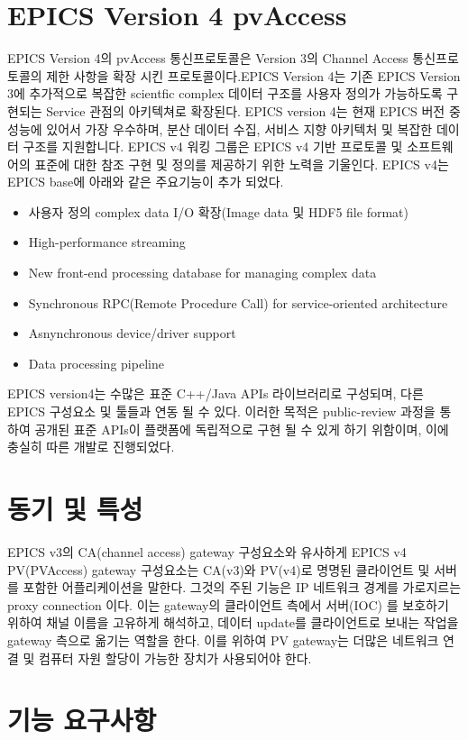 \documentclass[11pt
  , a4paper
  , article
  , oneside
]{memoir}
\begin{document}
\section{EPICS Version 4 pvAccess}
EPICS Version 4의 pvAccess 통신프로토콜은 Version 3의 Channel Access 통신프로토콜의 제한 사항을 확장 시킨 프로토콜이다.EPICS Version 4는 기존 EPICS Version 3에 추가적으로 복잡한 scientfic complex 데이터 구조를 사용자 정의가 가능하도록 구현되는 Service 관점의 아키텍쳐로 확장된다. EPICS version 4는 현재 EPICS 버전 중 성능에 있어서 가장 우수하며, 분산 데이터 수집, 서비스 지향 아키텍처 및 복잡한 데이터 구조를 지원합니다. EPICS v4 워킹 그룹은 EPICS v4 기반 프로토콜 및 소프트웨어의 표준에 대한 참조 구현 및 정의를 제공하기 위한 노력을 기울인다. 
\hfil\break\hfil\break
EPICS v4는 EPICS base에 아래와 같은 주요기능이 추가 되었다.
\begin{itemize}
	\item 사용자 정의 complex data I/O 확장(Image data 및 HDF5 file format)
	\item High-performance streaming
	\item New front-end processing database for managing complex data
	\item Synchronous RPC(Remote Procedure Call) for service-oriented architecture
	\item Asnynchronous device/driver support
	\item Data processing pipeline
\end{itemize}

EPICS version4는 수많은 표준 C++/Java APIs 라이브러리로 구성되며, 다른 EPICS 구성요소 및 툴들과 연동 될 수 있다. 이러한 목적은 public-review 과정을 통하여 공개된 표준 APIs이 플랫폼에 독립적으로 구현 될 수 있게 하기 위함이며, 이에 충실히 따른 개발로 진행되었다.

\section{동기 및 특성}
EPICS v3의 CA(channel access) gateway 구성요소와 유사하게 EPICS v4 PV(PVAccess) gateway 구성요소는 CA(v3)와 PV(v4)로 명명된 클라이언트 및 서버를 포함한 어플리케이션을 말한다. 그것의 주된 기능은 IP 네트워크 경계를 가로지르는 proxy connection 이다. 이는 gateway의 클라이언트 측에서 서버(IOC) 를 보호하기 위하여 채널 이름을 고유하게 해석하고, 데이터 update를 클라이언트로 보내는 작업을 gateway 측으로 옮기는 역할을 한다. 이를 위하여 PV gateway는 더많은 네트워크 연결 및 컴퓨터 자원 할당이 가능한 장치가 사용되어야 한다. 

\section{기능 요구사항}
\end{document}
